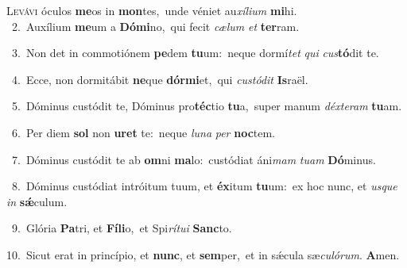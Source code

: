 \lettrine{\initial\textcolor{\initialcolor}{L}}{evávi} óculos \textbf{me}\-os in \textbf{mon}\-tes,~\star unde véniet au\-\textit{xí}\-\textit{li}\textit{um} \textbf{mi}\-hi.\\
{\numbfont\textcolor{\numbcolor}{~2.}}~Auxílium \textbf{me}\-um a \textbf{Dó}\-\textbf{mi}no,~\star qui fecit \textit{cæ}\-\textit{lum} \textit{et} \textbf{ter}\-ram.\par
{\numbfont\textcolor{\numbcolor}{~3.}}~Non det in commotiónem \textbf{pe}\-dem \textbf{tu}\-um:~\star neque dormí\textit{tet} \textit{qui} \textit{cus}\-\textbf{tó}dit te.\par
{\numbfont\textcolor{\numbcolor}{~4.}}~Ecce, non dormitábit \textbf{ne}\-que \textbf{dór}\-\textbf{mi}et,~\star qui \textit{cus}\-\textit{tó}\textit{dit} \textbf{Is}\-raël.\par
{\numbfont\textcolor{\numbcolor}{~5.}}~Dóminus custódit te, Dóminus pro\-\textbf{téc}\-tio \textbf{tu}\-a,~\star super manum \textit{déx}\-\textit{te}\textit{ram} \textbf{tu}\-am.\par
{\numbfont\textcolor{\numbcolor}{~6.}}~Per diem \textbf{sol} non \textbf{u}\-\textbf{ret} te:~\star neque \textit{lu}\-\textit{na} \textit{per} \textbf{noc}\-tem.\par
{\numbfont\textcolor{\numbcolor}{~7.}}~Dóminus custódit te ab \textbf{om}\-ni \textbf{ma}\-lo:~\star custódiat áni\textit{mam} \textit{tu}\-\textit{am} \textbf{Dó}\-minus.\par
{\numbfont\textcolor{\numbcolor}{~8.}}~Dóminus custódiat intróitum tuum, et \textbf{éx}\-itum \textbf{tu}\-um:~\star ex hoc nunc, et \textit{us}\-\textit{que} \textit{in} \textbf{sǽ}\-culum.\par
{\numbfont\textcolor{\numbcolor}{~9.}}~Glória \textbf{Pa}\-tri, et \textbf{Fí}\-\textbf{li}o,~\star et Spi\-\textit{rí}\-\textit{tu}\textit{i} \textbf{Sanc}\-to.\par
{\numbfont\textcolor{\numbcolor}{10.}}~Sicut erat in princípio, et \textbf{nunc}\-, et \textbf{sem}\-per,~\star et in sǽcula sæ\-\textit{cu}\-\textit{ló}\textit{rum}. \textbf{A}\-men.\par
